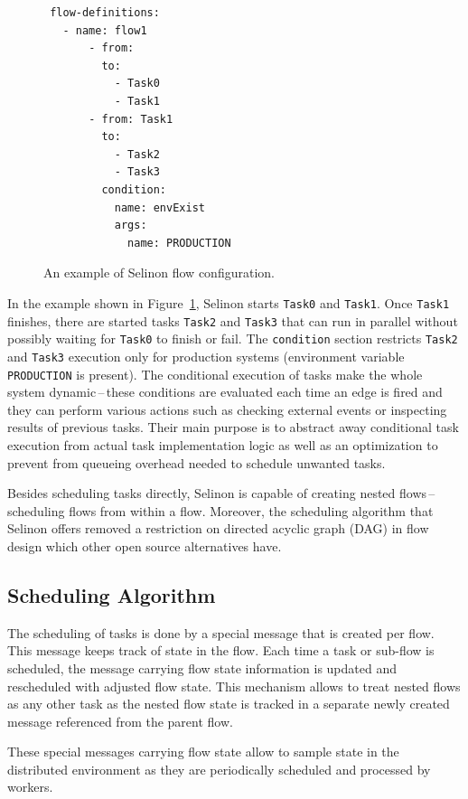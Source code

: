 \documentclass[a4paper]{llncs}
\begin{document}
\begin{figure}[h!]
\begin{verbatim}
 flow-definitions:
   - name: flow1
       - from:
         to:
           - Task0
           - Task1
       - from: Task1
         to:
           - Task2
           - Task3
         condition:
           name: envExist
           args:
             name: PRODUCTION
\end{verbatim}
  \caption{An example of Selinon flow configuration.}
  \label{conf_flow}
\end{figure}

In the example shown in Figure~\ref{conf_flow}, Selinon starts \texttt{Task0} and \texttt{Task1}. Once \texttt{Task1} finishes, there are started tasks \texttt{Task2} and \texttt{Task3} that can run in parallel without possibly waiting for \texttt{Task0} to finish or fail. The \texttt{condition} section restricts \texttt{Task2} and \texttt{Task3} execution only for production systems (environment variable \texttt{PRODUCTION} is present). The conditional execution of tasks make the whole system dynamic\,--\,these conditions are evaluated each time an edge is fired and they can perform various actions such as checking external events or inspecting results of previous tasks. Their main purpose is to abstract away conditional task execution from actual task implementation logic as well as an optimization to prevent from queueing overhead needed to schedule unwanted tasks.

Besides scheduling tasks directly, Selinon is capable of creating nested flows\,--\,scheduling flows from within a flow. Moreover, the scheduling algorithm that Selinon offers removed a restriction on directed acyclic graph (DAG) in flow design which other open source alternatives have.

\subsection{Scheduling Algorithm}

The scheduling of tasks is done by a special message that is created per flow. This message keeps track of state in the flow. Each time a task or sub-flow is scheduled, the message carrying flow state information is updated and rescheduled with adjusted flow state. This mechanism allows to treat nested flows as any other task as the nested flow state is tracked in a separate newly created message referenced from the parent flow.

These special messages carrying flow state allow to sample state in the distributed environment as they are periodically scheduled and processed by wor\-kers.
\end{document}
